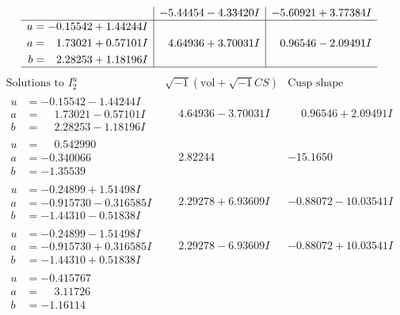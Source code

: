\documentclass[1p]{elsarticle_modified}
\theoremstyle{definition}
\newcommand{\I}{\sqrt{-1}}
\begin{document}
$$\begin{array}{c|c|c}
 & -5.44454 - 4.33420 I & -5.60921 + 3.77384 I \\ \hline\begin{aligned}
u &= -0.15542 + 1.44244 I \\
a &= \phantom{-}1.73021 + 0.57101 I \\
b &= \phantom{-}2.28253 + 1.18196 I\end{aligned}
 & \phantom{-}4.64936 + 3.70031 I & \phantom{-}0.96546 - 2.09491 I\\
 \hline 
 \end{array}$$\newpage$$\begin{array}{c|c|c}  
\text{Solutions to }I^u_{2}& \I (\text{vol} + \sqrt{-1}CS) & \text{Cusp shape}\\
 \hline 
\begin{aligned}
u &= -0.15542 - 1.44244 I \\
a &= \phantom{-}1.73021 - 0.57101 I \\
b &= \phantom{-}2.28253 - 1.18196 I\end{aligned}
 & \phantom{-}4.64936 - 3.70031 I & \phantom{-}0.96546 + 2.09491 I \\ \hline\begin{aligned}
u &= \phantom{-}0.542990\phantom{ +0.000000I} \\
a &= -0.340066\phantom{ +0.000000I} \\
b &= -1.35539\phantom{ +0.000000I}\end{aligned}
 & \phantom{-}2.82244\phantom{ +0.000000I} & -15.1650\phantom{ +0.000000I} \\ \hline\begin{aligned}
u &= -0.24899 + 1.51498 I \\
a &= -0.915730 - 0.316585 I \\
b &= -1.44310 - 0.51838 I\end{aligned}
 & \phantom{-}2.29278 + 6.93609 I & -0.88072 - 10.03541 I \\ \hline\begin{aligned}
u &= -0.24899 - 1.51498 I \\
a &= -0.915730 + 0.316585 I \\
b &= -1.44310 + 0.51838 I\end{aligned}
 & \phantom{-}2.29278 - 6.93609 I & -0.88072 + 10.03541 I \\ \hline\begin{aligned}
u &= -0.415767\phantom{ +0.000000I} \\
a &= \phantom{-}3.11726\phantom{ +0.000000I} \\
b &= -1.16114\phantom{ +0.000000I}\end{aligned}

\end{array}$$
\end{document}
